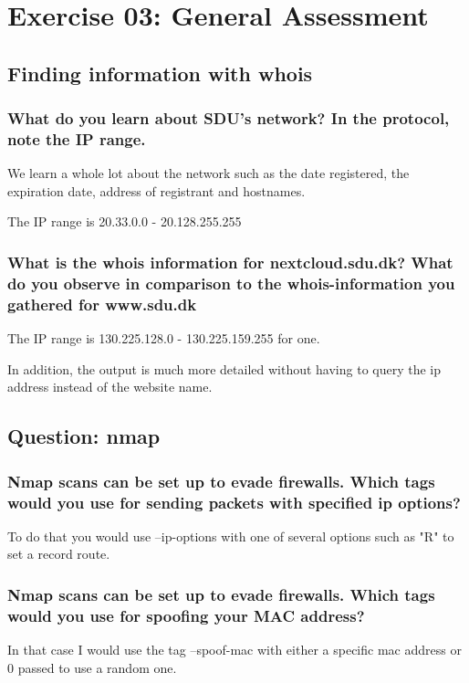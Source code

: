 \section*{Exercise 03: General Assessment}

\subsection*{Finding information with whois}

\subsubsection*{What do you learn about SDU's network? In the protocol, note the IP range.}
We learn a whole lot about the network such as the date registered, the expiration date, address of registrant and hostnames.


The IP range is 20.33.0.0 - 20.128.255.255

\subsubsection*{What is the whois information for nextcloud.sdu.dk? What do you observe in comparison to the whois-information you gathered for www.sdu.dk}


The IP range is 130.225.128.0 - 130.225.159.255 for one.

In addition, the output is much more detailed without having to query the ip address instead of the website name.

\subsection*{Question: nmap}
\subsubsection*{Nmap scans can be set up to evade firewalls. Which tags would you use for sending packets with specified ip options?}
To do that you would use --ip-options with one of several options such as "R" to set a record route.
\subsubsection*{Nmap scans can be set up to evade firewalls. Which tags would you use for spoofing your MAC address?}
In that case I would use the tag --spoof-mac with either a specific mac address or 0 passed to use a random one.

